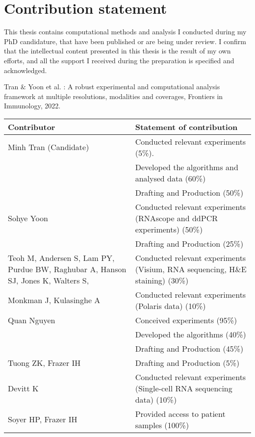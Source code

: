 \section*{Contribution statement}
This thesis contains computational methods and analysis I conducted during my PhD candidature, that have been published or are being under review. I confirm that the intellectual content presented in this thesis is the result of my own efforts, and all the support I received during the preparation is specified and acknowledged.


\begin{instructional}
	Tran $\&$ Yoon et al. \cite{tran2022robust}: A robust experimental and computational analysis framework at multiple resolutions, modalities and coverages, Frontiers in Immunology, 2022. 
\begin{table}[ht]	
\begin{tabularx}{\textwidth}{|X|X|} 
 \hline
 Contributor & Statement of contribution \\ 
 \hline\hline
 Minh Tran (Candidate) & Conducted relevant experiments (5\%). \\ 
 & Developed the algorithms and analysed data (60\%)  \\ 
 & Drafting and Production (50\%) \\
 \hline
 Sohye Yoon & Conducted relevant experiments (RNAscope and ddPCR experiments) (50\%)   \\
 & Drafting and Production (25\%) \\
 \hline
 Teoh M, Andersen S, Lam PY, Purdue BW, Raghubar A, Hanson SJ, Jones K, Walters S,  & Conducted relevant experiments (Visium, RNA sequencing, H$\&$E staining) (30\%) \\
 \hline
 Monkman J, Kulasinghe A & Conducted relevant experiments (Polaris data) (10\%) \\
 \hline
 Quan Nguyen & Conceived experiments (95\%) \\
  & Developed the algorithms (40\%) \\
  & Drafting and Production (45\%) \\
 \hline
 Tuong ZK, Frazer IH & Drafting and Production (5\%) \\
 \hline
 Devitt K & Conducted relevant experiments (Single-cell RNA sequencing data) (10\%) \\
 \hline
 Soyer HP, Frazer IH & Provided access to patient samples (100\%)  \\ [1ex] 
 \hline
\end{tabularx}
\end{table} 
\end{instructional}

